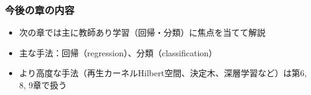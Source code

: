 \documentclass[dvipdfmx,cjk]{beamer}
\theoremstyle{example}
\begin{document}
\begin{frame}
    \frametitle{今後の章の内容}
    \begin{itemize}
        \item 次の章では主に教師あり学習（回帰・分類）に焦点を当てて解説
        \item 主な手法：回帰（regression）、分類（classification）
        \item より高度な手法（再生カーネルHilbert空間、決定木、深層学習など）は第6, 8, 9章で扱う
    \end{itemize}
\end{frame}
\end{document}
